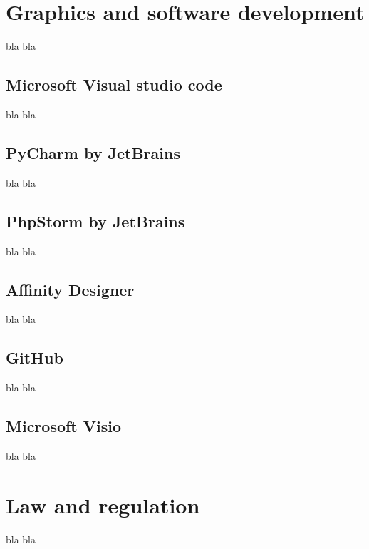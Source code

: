 \section{Graphics and software development}
bla bla

\subsection{Microsoft Visual studio code}
\label{subsec:ms-visual-studio-code}
bla bla

\subsection{PyCharm by JetBrains}
\label{subsec:pycharm}
bla bla

\subsection{PhpStorm by JetBrains}
\label{subsec:phpstorm}
bla bla

\subsection{Affinity Designer}
\label{subsec:affinity-designer}
bla bla

\subsection{GitHub}
\label{subsec:github}
bla bla

\subsection{Microsoft Visio}
\label{subsec:ms-visio}
bla bla

\section{Law and regulation}
bla bla
